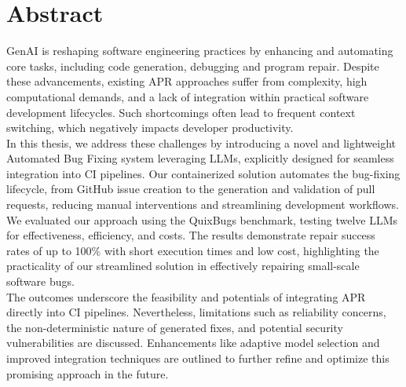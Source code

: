 \thispagestyle{empty}%

\section*{Abstract}
\ac{GenAI} is reshaping software engineering practices by enhancing and automating core tasks, including code generation, debugging and program repair. Despite these advancements, existing \ac{APR} approaches suffer from complexity, high computational demands, and a lack of integration within practical software development lifecycles. Such shortcomings often lead to frequent context switching, which negatively impacts developer productivity.\\
In this thesis, we address these challenges by introducing a novel and lightweight Automated Bug Fixing system leveraging \acp{LLM}, explicitly designed for seamless integration into \ac{CI} pipelines. Our containerized solution automates the bug-fixing lifecycle, from GitHub issue creation to the generation and validation of pull requests, reducing manual interventions and streamlining development workflows.\\
We evaluated our approach using the QuixBugs benchmark, testing twelve LLMs for effectiveness, efficiency, and costs. The results demonstrate repair success rates of up to 100\% with short execution times and low cost, highlighting the practicality of our streamlined solution in effectively repairing small-scale software bugs. \\
The outcomes underscore the feasibility and potentials of integrating APR directly into \ac{CI} pipelines. Nevertheless, limitations such as reliability concerns, the non-deterministic nature of generated fixes, and potential security vulnerabilities are discussed. Enhancements like adaptive model selection and improved integration techniques are outlined to further refine and optimize this promising approach in the future.
